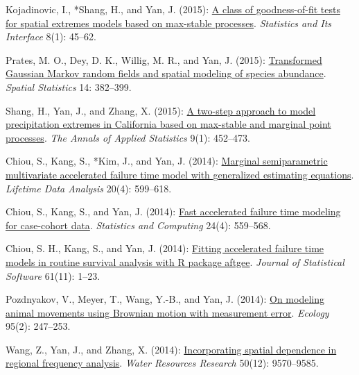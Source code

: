 \begin{RefereedJournalArticles}
\item Kojadinovic, I., *Shang, H., and Yan, J. (2015):
\href{https://doi.org/10.4310/sii.2015.v8.n1.a5}{A class of
goodness-of-fit tests for spatial extremes models based on max-stable
processes}. \emph{Statistics and Its Interface} 8(1): 45--62.

\item *Prates, M. O., Dey, D. K., Willig, M. R., and Yan, J.
(2015): \href{https://doi.org/10.1016/j.spasta.2015.07.004}{Transformed
Gaussian Markov random fields and spatial modeling of species
abundance}. \emph{Spatial Statistics} 14: 382--399.

\item *Shang, H., Yan, J., and Zhang, X. (2015):
\href{https://doi.org/10.1214/14-aoas804}{A two-step approach to model
precipitation extremes in California based on max-stable and marginal
point processes}. \emph{The Annals of Applied Statistics} 9(1):
452--473.

\item *Chiou, S., Kang, S., *Kim, J., and Yan, J.
(2014): \href{https://doi.org/10.1007/s10985-014-9292-x}{Marginal
semiparametric multivariate accelerated failure time model with
generalized estimating equations}. \emph{Lifetime Data Analysis} 20(4):
599--618.

\item *Chiou, S., Kang, S., and Yan, J. (2014):
\href{https://doi.org/10.1007/s11222-013-9388-2}{Fast accelerated
failure time modeling for case-cohort data}. \emph{Statistics and
Computing} 24(4): 559--568.

\item *Chiou, S. H., Kang, S., and Yan, J. (2014):
\href{https://doi.org/10.18637/jss.v061.i11}{Fitting accelerated failure
time models in routine survival analysis with R package aftgee}.
\emph{Journal of Statistical Software} 61(11): 1--23.

\item Pozdnyakov, V., Meyer, T., Wang, Y.-B., and Yan, J. (2014):
\href{https://doi.org/10.1890/13-0532.1}{On modeling animal movements
using Brownian motion with measurement error}. \emph{Ecology} 95(2):
247--253.

\item *Wang, Z., Yan, J., and Zhang, X. (2014):
\href{https://doi.org/10.1002/2013WR014849}{Incorporating spatial
dependence in regional frequency analysis}. \emph{Water Resources
Research} 50(12): 9570--9585.


\end{RefereedJournalArticles}
